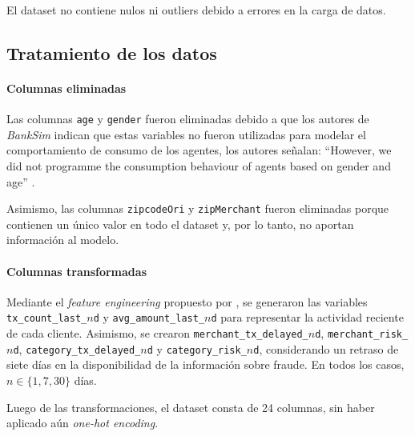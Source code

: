 \begin{nota}
El dataset no contiene nulos ni outliers debido a errores en la carga de datos.
\end{nota}

\subsection{Tratamiento de los datos}

\paragraph{Columnas eliminadas}

Las columnas \texttt{age} y \texttt{gender} fueron eliminadas debido a que los autores de \textit{BankSim} indican que estas variables no fueron utilizadas para modelar el comportamiento de consumo de los agentes, los autores señalan: ``However, we did not programme the consumption behaviour of agents based on gender and age'' \parencite[p. 150]{inproceedings}.

Asimismo, las columnas \texttt{zipcodeOri} y \texttt{zipMerchant} fueron eliminadas porque contienen un único valor en todo el dataset y, por lo tanto, no aportan información al modelo.

\paragraph{Columnas transformadas}

Mediante el \textit{feature engineering} propuesto por \textcite[sección 3.3]{leborgne2022fraud}, se generaron las variables \nolinkurl{tx_count_last_}\(n\)\nolinkurl{d} y \nolinkurl{avg_amount_last_}\(n\)\nolinkurl{d} para representar la actividad reciente de cada cliente. Asimismo, se crearon \nolinkurl{merchant_tx_delayed_}\(n\)\nolinkurl{d}, \nolinkurl{merchant_risk_}\(n\)\nolinkurl{d}, \nolinkurl{category_tx_delayed_}\(n\)\nolinkurl{d} y \nolinkurl{category_risk_}\(n\)\nolinkurl{d}, considerando un retraso de siete días en la disponibilidad de la información sobre fraude. En todos los casos, \(n \in \{1,7,30\}\) días.

\begin{nota}
Luego de las transformaciones, el dataset consta de 24 columnas, sin haber aplicado aún \textit{one-hot encoding}.
\end{nota}